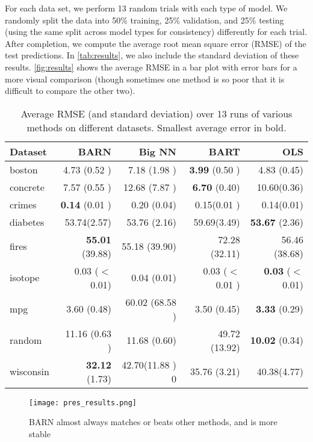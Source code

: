 \documentclass[12pt]{article}
\begin{document}
For each data set, we perform 13 random trials with each type of model.  We randomly split the data into 50\% training, 25\% validation, and 25\% testing (using the same split across model types for consistency) differently for each trial.  After completion, we compute the average root mean square error (RMSE) of the test predictions.  In \autoref{tab:results}, we also include the standard deviation of these results.  \autoref{fig:results} shows the average RMSE in a bar plot with error bars for a more visual comparison (though sometimes one method is so poor that it is difficult to compare the other two).

\begin{table}[htb]
\centering
\caption{Average RMSE (and standard deviation) over 13 runs of various methods on different datasets.  Smallest average error in bold.}
\begin{tabular}{lrrrr}
Dataset   &     BARN &    Big NN &      BART & OLS\\ \hline
boston    &  4.73 (0.52 )  &  7.18 (1.98 )  &  \textbf{3.99} (0.50 )  &  4.83 (0.45) \\
concrete   & 7.57 (0.55 )  & 12.68 (7.87 )  &  \textbf{6.70} (0.40)  & 10.60(0.36) \\
crimes     & \textbf{0.14 } (0.01 )  & 0.20 (0.04)  &  0.15(0.01 )  & 0.14(0.01) \\
diabetes  & 53.74(2.57)  & 53.76 (2.16)&  59.69(3.49)  & \textbf{53.67} (2.36) \\
fires     & \textbf{55.01} (39.88)  & 55.18 (39.90) &  72.28 (32.11)  & 56.46 (38.68) \\
    isotope    & 0.03  ($<$0.01)  & 0.04 (0.01)  &  0.03 ($<$0.01 )  & \textbf{0.03} ($<$0.01) \\
mpg        & 3.60 (0.48)  & 60.02 (68.58 )  &  3.50  (0.45)  & \textbf{3.33} (0.29) \\
random    & 11.16 (0.63 )  & 11.68 (0.60) &  49.72 (13.92)  & \textbf{10.02} (0.34) \\
wisconsin & \textbf{32.12} (1.73)  & 42.70(11.88 ) 0&  35.76 (3.21)  & 40.38(4.77) \\
\end{tabular}
    \label{tab:results}
\end{table}

\begin{figure}[ht]
\centering
    \texttt{[image: pres\_results.png]}
    \caption{BARN almost always matches or beats other methods, and is more stable}
    \label{fig:results}
\end{figure}
\end{document}
